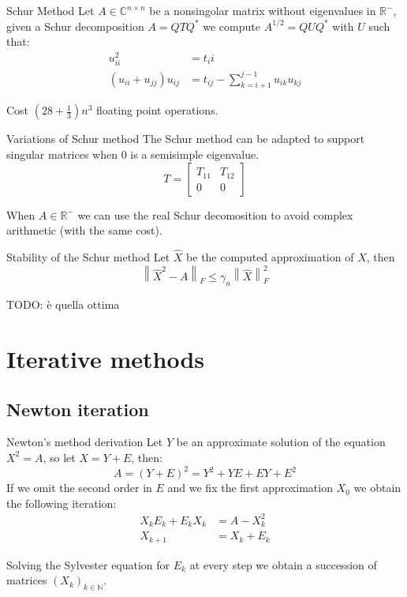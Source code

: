 \documentclass{beamer}
\theoremstyle{plain}
\theoremstyle{definition}
\theoremstyle{remark}
\newcommand{\pa}[1]{\left(#1\right)}
\newcommand{\bra}[1]{\left[#1\right]}
\newcommand{\norm}[1]{\left\|#1\right\|}
\begin{document}
\begin{frame}{Schur Method}
  Let $A \in \mathbb{C}^{n\times n}$ be a nonsingolar matrix without
  eigenvalues in $\mathbb{R}^-$, given a Schur decomposition
  $A = QTQ^*$ we compute $A^{1/2} = Q U Q^*$ with $U$ such that:
  \begin{align*}
    u_{ii}^2 &= t_ii \\
    \pa{u_{ii} + u_{jj}} u_{ij} &= t_{ij} - \sum _{k=i+1} ^{j-1}
                                  u_{ik}u_{kj}
  \end{align*}
  
  \begin{block}{Cost}
    $\pa{ 28+\frac{1}{3}} n^3$ floating point operations.
  \end{block}
\end{frame}

\begin{frame}{Variations of Schur method}
  The Schur method can be adapted to support singular matrices when
  $0$ is a semisimple eigenvalue.
  \[ T = \bra{
      \begin{matrix}
        T_{11} & T_{12} \\
        0 & 0 
      \end{matrix}
    } \]
  \vfill

  When $A \in \mathbb{R}^-$ we can use the real Schur decomosition to
  avoid complex arithmetic (with the same cost).
\end{frame}

\begin{frame}{Stability of the Schur method}
  Let $\hat {X}$ be the computed approximation of $X$, then
  \[ \norm{{\hat{X}}^2 - A} _F \le \gamma _n \norm{\hat{X}}_F ^2 \]
  
  TODO: è quella ottima
\end{frame}

\section{Iterative methods}

\subsection{Newton iteration}

\begin{frame}{Newton's method derivation}
  Let $Y$ be an approximate solution of the equation $X^2 = A$, so let
  $X = Y+E$, then:
  \[ A = \pa{Y+E}^2 = Y^2 + YE + EY + E^2 \]
  If we omit the second order in $E$ and we fix the first
  approximation $X_0$ we obtain the following iteration:
  \begin{align*}
    X_k E_k + E_k X_k &= A - X_k ^2 \\
    X_{k+1} &= X_k + E_k
  \end{align*}
  
  Solving the Sylvester equation for $E_k$ at every step we obtain a
  succession of matrices $\pa{ X_k} _{k\in \mathbb{N}}$.
\end{frame}
\end{document}
